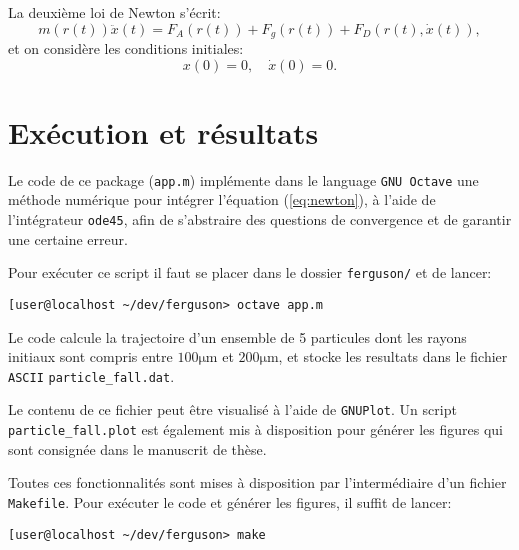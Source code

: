 La deuxi\`eme loi de Newton s'\'ecrit:
\begin{equation}\label{eq:newton}
  m(r(t))\ddot x(t) = F_A(r(t)) + F_g(r(t)) + F_D(r(t), \dot x(t)),
\end{equation}
et on consid\`ere les conditions initiales:
\begin{equation}
  x(0) = 0,\quad \dot x(0) = 0.
\end{equation}

\section{Ex\'ecution et r\'esultats}
Le code de ce package (\texttt{app.m}) impl\'emente dans le language \texttt{GNU
  Octave} une m\'ethode num\'erique pour int\'egrer l'\'equation
(\ref{eq:newton}), \`a l'aide de l'int\'egrateur \texttt{ode45}, afin
de s'abstraire des questions de convergence et de garantir une
certaine erreur.

Pour ex\'ecuter ce script il faut se placer dans le dossier
\texttt{ferguson/} et de lancer:
\begin{lstlisting}[frame=single, language={},basicstyle=\ttfamily\footnotesize]
  [user@localhost ~/dev/ferguson> octave app.m
\end{lstlisting}

Le code calcule la trajectoire d'un ensemble de 5 particules dont les
rayons initiaux sont compris entre $100\si{\micro\meter}$ et
$200\si{\micro\meter}$, et stocke les resultats dans le fichier
\texttt{ASCII} \texttt{particle\_fall.dat}.

Le contenu de ce fichier peut \^etre visualis\'e \`a l'aide de
\texttt{GNUPlot}. Un script \texttt{particle\_fall.plot} est
\'egalement mis \`a disposition pour g\'en\'erer les figures qui sont
consign\'ee dans le manuscrit de th\`ese.

Toutes ces fonctionnalit\'es sont mises \`a disposition par
l'interm\'ediaire d'un fichier \texttt{Makefile}. Pour ex\'ecuter le
code et g\'en\'erer les figures, il suffit de lancer:
\begin{lstlisting}[frame=single,language={},basicstyle=\ttfamily\footnotesize]
  [user@localhost ~/dev/ferguson> make
\end{lstlisting}

